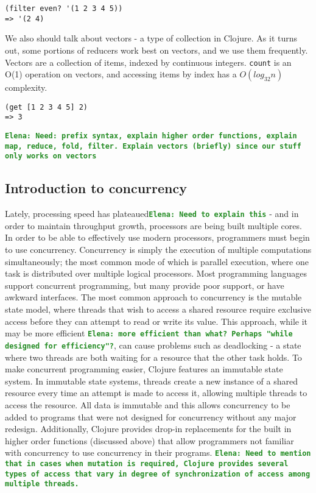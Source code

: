 \documentclass[12pt]{article}
\newcommand{\comment}[1]{{\bf \tt  {#1}}}
\newcommand{\emcomment}[1]{\textcolor{ForestGreen}{\comment{Elena: {#1}}}}
\newcommand{\clocode}[1]{{\texttt {#1}}}
\begin{document}
\begin{verbatim}
(filter even? '(1 2 3 4 5))
=> '(2 4)
\end{verbatim}
We also should talk about vectors - a type of collection in Clojure. As it turns out, some portions of reducers work best on vectors, and we use them frequently. Vectors are a collection of items, indexed by continuous integers. \clocode{count} is an O(1) operation on vectors, and accessing items by index has a $O(log_{32}n)$  complexity. 
\begin{verbatim}
(get [1 2 3 4 5] 2)
=> 3
\end{verbatim}
\emcomment{Need: prefix syntax, explain higher order functions, explain map, reduce, fold, filter. Explain vectors (briefly) since our stuff only works on vectors}


\subsection{Introduction to concurrency}\label{sec:concurrency}
 Lately, processing speed has plateaued\emcomment{Need to explain this} - and in order to maintain throughput growth, processors are being built multiple cores. In order to be able to effectively use modern processors, programmers must begin to use concurrency. Concurrency is simply the execution of multiple computations simultaneously; the most common mode of which is parallel execution, where one task is distributed over multiple logical processors. Most programming languages support concurrent programming, but many provide poor support, or have awkward interfaces. The most common approach to concurrency is the mutable state model, where threads that wish to access a shared resource require exclusive access before they can attempt to read or write its value. This approach, while it may be more efficient \emcomment{more efficient than what? Perhaps "while designed for efficiency"?}, can cause problems such as deadlocking - a state where two threads are both waiting for a resource that the other task holds. To make concurrent programming easier, Clojure features an immutable state system. In immutable state systems, threads create a new instance of a shared resource every time an attempt is made to access it, allowing multiple threads to access the resource. All data is immutable and this allows concurrency to be added to programs that were not designed for concurrency without any major redesign. Additionally, Clojure provides drop-in replacements for the built in higher order functions (discussed above) that allow programmers not familiar with concurrency to use concurrency in their programs.
\emcomment{Need to mention that in cases when mutation is required, Clojure provides several types of access that vary in degree of synchronization of access among multiple threads.}
\end{document}

